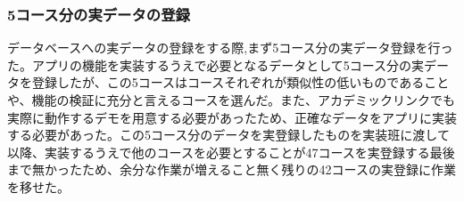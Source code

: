 ﻿\subsubsection{5コース分の実データの登録}
データベースへの実データの登録をする際,まず5コース分の実データ登録を行った。アプリの機能を実装するうえで必要となるデータとして5コース分の実データを登録したが、この5コースはコースそれぞれが類似性の低いものであることや、機能の検証に充分と言えるコースを選んだ。また、アカデミックリンクでも実際に動作するデモを用意する必要があったため、正確なデータをアプリに実装する必要があった。この5コース分のデータを実登録したものを実装班に渡して以降、実装するうえで他のコースを必要とすることが47コースを実登録する最後まで無かったため、余分な作業が増えること無く残りの42コースの実登録に作業を移せた。


